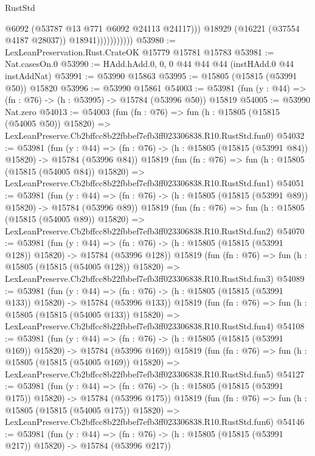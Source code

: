 \begin{lexlean}{RustStd}
\begin{coremodule}
                              @6092
                              (@53787 @13 @771 @6092 @24113 @24117)))
                          @18929
                          (@16221 (@37554 @4187 @28037))
                          @18941)))))))))))
@53980 := LexLeanPreservation.Rust.CrateOK @15779 @15781 @15783
@53981 := Nat.casesOn.{0}
@53990 := HAdd.hAdd.{0, 0, 0} @44 @44 @44 (instHAdd.{0} @44 instAddNat)
@53991 := @53990 @15863
@53995 := @15805 (@15815 (@53991 @50)) @15820
@53996 := @53990 @15861
@54003 := @53981 (fun (y : @44) => (fn : @76) -> (h : @53995) -> @15784 (@53996 @50)) @15819
@54005 := @53990 Nat.zero
@54013 := @54003
    (fun (fn : @76) =>
    fun (h : @15805 (@15815 (@54005 @50)) @15820) =>
    LexLeanPreserve.Cb2bffcc8b22fbbef7efb3ff023306838.R10.RustStd.fun0)
@54032 := @53981
    (fun (y : @44) =>
    (fn : @76) -> (h : @15805 (@15815 (@53991 @84)) @15820) -> @15784 (@53996 @84))
    @15819
    (fun (fn : @76) =>
    fun (h : @15805 (@15815 (@54005 @84)) @15820) =>
    LexLeanPreserve.Cb2bffcc8b22fbbef7efb3ff023306838.R10.RustStd.fun1)
@54051 := @53981
    (fun (y : @44) =>
    (fn : @76) -> (h : @15805 (@15815 (@53991 @89)) @15820) -> @15784 (@53996 @89))
    @15819
    (fun (fn : @76) =>
    fun (h : @15805 (@15815 (@54005 @89)) @15820) =>
    LexLeanPreserve.Cb2bffcc8b22fbbef7efb3ff023306838.R10.RustStd.fun2)
@54070 := @53981
    (fun (y : @44) =>
    (fn : @76) -> (h : @15805 (@15815 (@53991 @128)) @15820) -> @15784 (@53996 @128))
    @15819
    (fun (fn : @76) =>
    fun (h : @15805 (@15815 (@54005 @128)) @15820) =>
    LexLeanPreserve.Cb2bffcc8b22fbbef7efb3ff023306838.R10.RustStd.fun3)
@54089 := @53981
    (fun (y : @44) =>
    (fn : @76) -> (h : @15805 (@15815 (@53991 @133)) @15820) -> @15784 (@53996 @133))
    @15819
    (fun (fn : @76) =>
    fun (h : @15805 (@15815 (@54005 @133)) @15820) =>
    LexLeanPreserve.Cb2bffcc8b22fbbef7efb3ff023306838.R10.RustStd.fun4)
@54108 := @53981
    (fun (y : @44) =>
    (fn : @76) -> (h : @15805 (@15815 (@53991 @169)) @15820) -> @15784 (@53996 @169))
    @15819
    (fun (fn : @76) =>
    fun (h : @15805 (@15815 (@54005 @169)) @15820) =>
    LexLeanPreserve.Cb2bffcc8b22fbbef7efb3ff023306838.R10.RustStd.fun5)
@54127 := @53981
    (fun (y : @44) =>
    (fn : @76) -> (h : @15805 (@15815 (@53991 @175)) @15820) -> @15784 (@53996 @175))
    @15819
    (fun (fn : @76) =>
    fun (h : @15805 (@15815 (@54005 @175)) @15820) =>
    LexLeanPreserve.Cb2bffcc8b22fbbef7efb3ff023306838.R10.RustStd.fun6)
@54146 := @53981
    (fun (y : @44) =>
    (fn : @76) -> (h : @15805 (@15815 (@53991 @217)) @15820) -> @15784 (@53996 @217))

\end{coremodule}
\end{lexlean}
